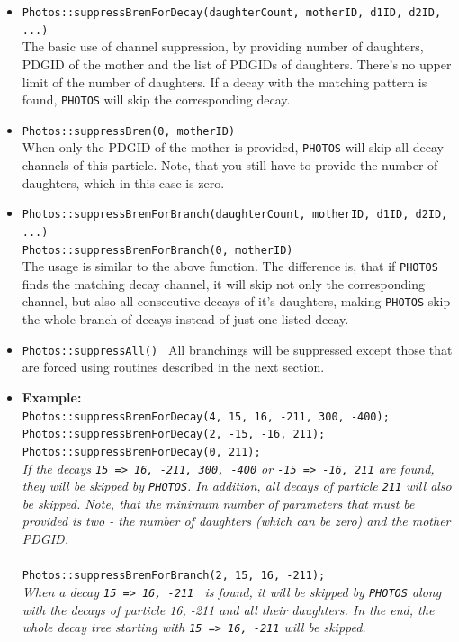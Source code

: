 \documentclass[]{Photos_interface_design}
\begin{document}
\begin{itemize}
 \item {\tt Photos::suppressBremForDecay(daughterCount, motherID, d1ID, d2ID, ...)} \hfill \\
       The basic use of channel suppression, by providing number of daughters,
	   PDGID of the mother and the list of PDGIDs of daughters.
	   There's no upper limit of the number of daughters.
	   If a decay with the matching pattern is found, {\tt PHOTOS} will skip the corresponding decay.
 \item {\tt Photos::suppressBrem(0, motherID)} \hfill \\
       When only the PDGID of the mother is provided, {\tt PHOTOS} will skip all decay channels
	   of this particle. Note, that you still have to provide the number of daughters,
	   which in this case is zero.
 \item {\tt Photos::suppressBremForBranch(daughterCount, motherID, d1ID, d2ID, ...)} \hfill \\
       {\tt Photos::suppressBremForBranch(0, motherID)} \hfill \\
       The usage is similar to the above function. The difference is,
	   that if {\tt PHOTOS} finds the matching decay channel, it will skip not only the corresponding channel,
	   but also all consecutive decays of it's daughters, making {\tt PHOTOS} skip the whole branch
	   of decays instead of just one listed decay.
 \item {\tt Photos::suppressAll() }
       All branchings will be suppressed except those that are forced using routines
	   described in the next section.
 \item \textbf{Example:} \hfill \\
{\tt Photos::suppressBremForDecay(4, 15, 16, -211, 300, -400); } \\
{\tt Photos::suppressBremForDecay(2, -15, -16, 211); } \\
{\tt Photos::suppressBremForDecay(0, 211); } \\
\emph{If the decays {\tt 15 => 16, -211, 300, -400} or {\tt -15 => -16, 211} are found, they will be skipped by {\tt PHOTOS}. In addition, all decays of particle {\tt 211} will also be skipped. Note, that the minimum number of parameters that must be provided is two - the number of daughters (which can be zero) and the mother PDGID.} \\ \\
{\tt Photos::suppressBremForBranch(2, 15, 16, -211); } \\
\emph{When a decay {\tt 15 => 16, -211 } is found, it will be skipped by {\tt PHOTOS} along with the decays of particle 16, -211 and all their daughters. In the end, the whole decay tree starting with {\tt 15 => 16, -211} will be skipped.}
\end{itemize}
\end{document}
